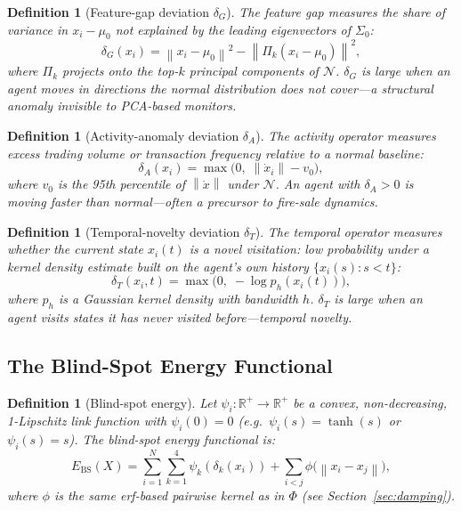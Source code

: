\documentclass[11pt]{article}
\newtheorem{definition}[theorem]{Definition}
\theoremstyle{definition}
\newcommand{\R}{\mathbb{R}}
\newcommand{\Ebs}{E_{\mathrm{BS}}}
\newcommand{\norm}[1]{\left\|#1\right\|}
\begin{document}
\begin{definition}[Feature-gap deviation $\delta_G$]
The feature gap measures the share of variance in $x_i - \mu_0$ not explained by
the leading eigenvectors of $\Sigma_0$:
\[
  \delta_G(x_i) = \norm{x_i - \mu_0}^2 - \norm{\Pi_k(x_i - \mu_0)}^2,
\]
where $\Pi_k$ projects onto the top-$k$ principal components of $\mathcal{N}$.
$\delta_G$ is large when an agent moves in directions the normal distribution does
not cover---a structural anomaly invisible to PCA-based monitors.
\end{definition}

\begin{definition}[Activity-anomaly deviation $\delta_A$]
The activity operator measures excess trading volume or transaction frequency
relative to a normal baseline:
\[
  \delta_A(x_i) = \max\bigl(0,\; \norm{\dot x_i} - v_0\bigr),
\]
where $v_0$ is the 95th percentile of $\norm{\dot x}$ under $\mathcal{N}$.
An agent with $\delta_A > 0$ is moving faster than normal---often a precursor to
fire-sale dynamics.
\end{definition}

\begin{definition}[Temporal-novelty deviation $\delta_T$]
The temporal operator measures whether the current state $x_i(t)$ is a novel
visitation: low probability under a kernel density estimate built on the agent's
own history $\{x_i(s) : s < t\}$:
\[
  \delta_T(x_i, t) = \max\bigl(0,\; -\log p_h(x_i(t))\bigr),
\]
where $p_h$ is a Gaussian kernel density with bandwidth $h$.  $\delta_T$ is large
when an agent visits states it has never visited before---temporal novelty.
\end{definition}

\subsection{The Blind-Spot Energy Functional}

\begin{definition}[Blind-spot energy]
\label{def:ebs}
Let $\psi_i : \R^+ \to \R^+$ be a convex, non-decreasing, 1-Lipschitz link
function with $\psi_i(0) = 0$ (e.g.\ $\psi_i(s) = \tanh(s)$ or $\psi_i(s) = s$).
The blind-spot energy functional is:
\begin{equation}\label{eq:ebs}
  \Ebs(X) = \sum_{i=1}^{N}\sum_{k=1}^{4}\psi_k(\delta_k(x_i))
             + \sum_{i < j}\phi\bigl(\norm{x_i - x_j}\bigr),
\end{equation}
where $\phi$ is the same erf-based pairwise kernel as in $\Phi$ (see
Section~\ref{sec:damping}).
\end{definition}
\end{document}
